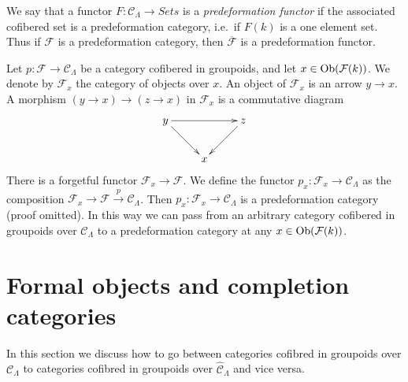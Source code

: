 \begin{remark}
\label{remark-predeformation-functor}
We say that a functor $F: \mathcal{C}_\Lambda \to \textit{Sets}$
is a {\it predeformation functor} if the associated cofibered set is a
predeformation category, i.e.\ if $F(k)$ is a one element set.  Thus if
$\mathcal{F}$ is a predeformation category, then $\overline{\mathcal{F}}$ is a
predeformation functor.
\end{remark}

\begin{remark}
\label{remark-localize-cofibered-groupoid}
Let $p : \mathcal{F} \to \mathcal{C}_\Lambda$ be a category cofibered in
groupoids, and let $x \in \mathop{\mathrm{Ob}}\nolimits(\mathcal{F}(k))$.  We denote by
$\mathcal{F}_x$ the category of objects over $x$.
An object of $\mathcal{F}_x$ is an arrow $y \to x$.
A morphism $(y \to x) \to (z \to x)$ in $\mathcal{F}_x$ is a commutative
diagram
$$
\xymatrix{
y \ar[rr] \ar[dr] & & z \ar[dl] \\
& x &
}
$$
There is a forgetful functor $\mathcal{F}_x \to \mathcal{F}$. We define
the functor $p_x : \mathcal{F}_x \to \mathcal{C}_\Lambda$ as the
composition
$\mathcal{F}_x \to \mathcal{F} \xrightarrow{p} \mathcal{C}_\Lambda$.
Then $p_x : \mathcal{F}_x \to \mathcal{C}_\Lambda$ is a
predeformation category (proof omitted). In this way we can pass from an
arbitrary category cofibered in groupoids over $\mathcal{C}_\Lambda$
to a predeformation category at any $x \in \mathop{\mathrm{Ob}}\nolimits(\mathcal{F}(k))$.
\end{remark}






\section{Formal objects and completion categories}
\label{section-formal-objects}

\noindent
In this section we discuss how to go between categories cofibred in
groupoids over $\mathcal{C}_\Lambda$ to categories cofibred in
groupoids over $\widehat{\mathcal{C}}_\Lambda$ and vice versa.

